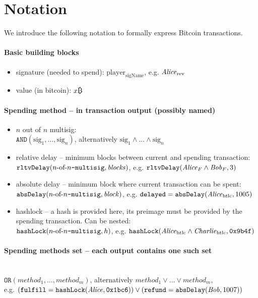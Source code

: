 \section{Notation}
  We introduce the following notation to formally express Bitcoin transactions.

  \paragraph{Basic building blocks}
    \begin{itemize}
      \item signature (needed to spend): $\mathrm{player}_{\mathrm{sigName}}$,
      e.g. $\mathit{Alice}_{\mathrm{rev}}$
      \item value (in bitcoin): $x\bitcoin$
    \end{itemize}

  \paragraph{Spending method -- in transaction output (possibly named)}
    \begin{itemize}
      \item $n$ out of $n$ multisig: \\
      $\mathtt{AND}(\mathrm{sig}_1, \dots, \mathrm{sig}_n)$, alternatively
      $\mathrm{sig}_1 \wedge \dots \wedge \mathrm{sig}_n$
      \item relative delay -- minimum blocks between current and spending
      transaction: \\
      $\mathtt{rltvDelay}(n\text{-of-}n\text{\tt -multisig}, \mathit{blocks})$, e.g. $\mathtt{rltvDelay}(\mathit{Alice}_{F} \wedge \mathit{Bob}_{F},
      3)$
      \item absolute delay -- minimum block where current transaction can be
      spent: \\
      $\mathtt{absDelay}(n\text{-of-}n\text{\tt -multisig}, \mathit{block})$, e.g. $\mathtt{delayed} =
      \mathtt{absDelay}(\mathit{Alice}_{\mathrm{htlc}}, 1005)$
      \item hashlock -- a hash is provided here, its preimage must be provided
      by the spending transaction. Can be nested:  \\
      $\mathtt{hashLock}(n\text{-of-}n\text{\tt -multisig}, h)$, e.g. $\mathtt{hashLock}(\mathit{Alice}_{\mathrm{htlc}} \wedge
      \mathit{Charlie}_{\mathrm{htlc}}, \mathtt{0x9b4f})$
    \end{itemize}

  \paragraph{Spending methods set -- each output contains one such set} \ \\
    $\mathtt{OR}(\mathit{method}_1, \dots, \mathit{method}_m)$,
    alternatively $\mathit{method}_1 \vee \dots \vee \mathit{method}_m$, \\
    e.g. $(\mathtt{fulfill} = \mathtt{hashLock}(\mathit{Alice}, \mathtt{0x1bc6})) \vee
    (\mathtt{refund} = \mathtt{absDelay}(\mathit{Bob}, 1007))$

